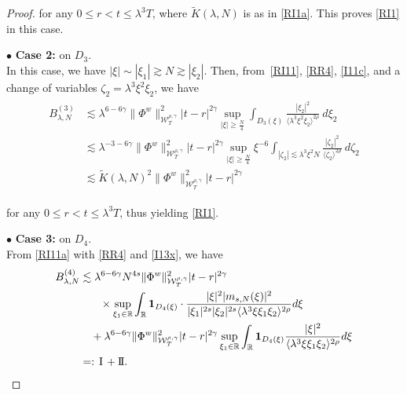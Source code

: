\documentclass[letterpaper, 11pt,  reqno]{amsart}
\newcommand{\1}{\hspace{0.5mm}\text{I}\hspace{0.5mm}}
\newcommand{\II}{\text{I \hspace{-2.8mm} I} }
\newcommand{\noi}{\noindent}
\newcommand{\R}{\mathbb{R}}
\newcommand{\g}{\gamma}
\newcommand{\ld}{\lambda}
\newcommand{\wt}{\widetilde}
\newcommand{\les}{\lesssim}
\newcommand{\ges}{\gtrsim}
\newcommand{\jb}[1]
{\langle #1 \rangle}
\newcommand{\ind}{\mathbf 1}
\newcommand{\W}{\mathcal{W}}
\newcommand{\z}{\zeta}
\numberwithin{equation}{section}
\numberwithin{theorem}{section}
\begin{document}
\begin{proof}
\noi
for any $0\leq r<t\leq \ld^3T$, 
where $\wt K(\ld, N)$ is as in \eqref{RI1a}. 
This proves
 \eqref{RI1} in this case.

\medskip

\noi
$\bullet$ \textbf{Case 2:} on  $D_3$.\\
\indent
In this case, we have $|\xi|\sim |\xi_1|\ges N \ges |\xi_2|$.
Then, from~\eqref{RI11},  \eqref{RR4}, 
 \eqref{I11c}, 
and
a change of variables $\z_2 = \ld^3 \xi^2 \xi_2$, we have 
\begin{align}
\begin{split}
B_{\ld, N}^{(3)}
&  \les 
\ld^{6- 6\g}
  \|\Phi^{w} \|^2_{\W^{\rho,\g}_T} |t-r|^{2\g}
\sup_{|\xi|\geq \frac N4}
\int_{D_3(\xi)} \frac{|\xi_2|^2}{
\jb{\ld^3 \xi^2 \xi_2}^{2\rho}}\
d\xi_2\\
&  \les 
\ld^{-3- 6\g}
  \|\Phi^{w} \|^2_{\W^{\rho,\g}_T} |t-r|^{2\g}
\sup_{|\xi|\geq \frac N4}\xi^{-6}
\int_{|\z_2|\les \ld^3 \xi^2 N} \frac{|\z_2|^2}{
\jb{\z_2}^{2\rho}}\
d\z_2\\
 &\les 
\wt K(\ld, N)^2
 \| \Phi^{w} \|^2_{\W_{T}^{\rho, \g}}  
|t-r|^{2\g}
\end{split}
\label{RI12}
 \end{align}
 
 
 \noi
for any $0\leq r<t\leq \ld^3T$, 
thus yielding \eqref{RI1}.





\medskip

\noi
$\bullet$ \textbf{Case 3:} on  $D_4$.\\
\indent
From \eqref{RI11a} with \eqref{RR4}  and \eqref{I13x}, we have 
\begin{align}
\begin{split}
B_{\ld, N}^{(4)}
& \les 
\ld^{6- 6\g}N^{4s }
\| \Phi^{w} \|^2_{\W_{T}^{\rho, \g}} 
|t-r|^{2\g} \\
& \hphantom{XX}
\times
\sup_{\xi_1 \in \R}
\int_\R
\ind_{D_4(\xi)}\cdot
\frac{|\xi|^2  |m_{s, N}(\xi)|^2}{|\xi_1|^{2s}|\xi_2|^{2s}\jb{\ld^3 \xi \xi_1 \xi_2}^{2\rho}}d\xi \\
& \quad + 
\ld^{6 -6\g}
\| \Phi^{w} \|^2_{\W_{T}^{\rho, \g}} 
|t-r|^{2\g}
\sup_{\xi_1 \in \R}
\int_\R
\ind_{D_4(\xi)}
\frac{|\xi|^2 }{\jb{\ld^3 \xi \xi_1 \xi_2}^{2\rho}}d\xi \\
 & =: \1 + \II.
\end{split}
\label{RI13a}
\end{align}










\end{proof}
\end{document}
